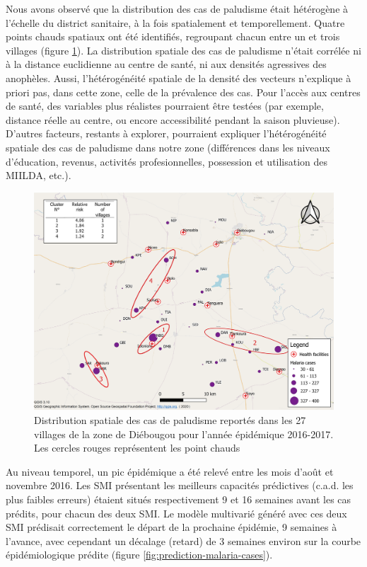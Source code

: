 \documentclass[12pt,twoside]{reedthesis}
\begin{document}
Nous avons observé que la distribution des cas de paludisme était hétérogène à l'échelle du district sanitaire, à la fois spatialement et temporellement. Quatre points chauds spatiaux ont été identifiés, regroupant chacun entre un et trois villages (figure \ref{fig:map-malaria-cases}). La distribution spatiale des cas de paludisme n'était corrélée ni à la distance euclidienne au centre de santé, ni aux densités agressives des anophèles. Aussi, l'hétérogénéité spatiale de la densité des vecteurs n'explique à priori pas, dans cette zone, celle de la prévalence des cas. Pour l'accès aux centres de santé, des variables plus réalistes pourraient être testées (par exemple, distance réelle au centre, ou encore accessibilité pendant la saison pluvieuse). D'autres facteurs, restants à explorer, pourraient expliquer l'hétérogénéité spatiale des cas de paludisme dans notre zone (différences dans les niveaux d'éducation, revenus, activités profesionnelles, possession et utilisation des MIILDA, etc.).\\
\begin{figure}

{\centering \includegraphics[width=0.9\linewidth]{figure/map_malaria_cases} 

}

\caption[Distribution spatiale des cas de paludisme reportés dans les 27 villages de la zone de Diébougou pour l'année épidémique 2016-2017]{Distribution spatiale des cas de paludisme reportés dans les 27 villages de la zone de Diébougou pour l'année épidémique 2016-2017. Les cercles rouges représentent les point chauds}\label{fig:map-malaria-cases}
\end{figure}
Au niveau temporel, un pic épidémique a été relevé entre les mois d'août et novembre 2016. Les SMI présentant les meilleurs capacités prédictives (c.a.d. les plus faibles erreurs) étaient situés respectivement 9 et 16 semaines avant les cas prédits, pour chacun des deux SMI. Le modèle multivarié généré avec ces deux SMI prédisait correctement le départ de la prochaine épidémie, 9 semaines à l'avance, avec cependant un décalage (retard) de 3 semaines environ sur la courbe épidémiologique prédite (figure \ref{fig:prediction-malaria-cases}).\\
\end{document}
